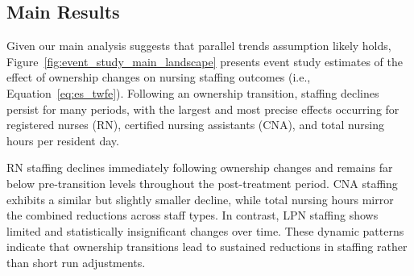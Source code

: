 \documentclass[12pt]{article}
\begin{document}
\subsection{Main Results}

Given our main analysis suggests that parallel trends assumption likely holds, Figure~\ref{fig:event_study_main_landscape} presents event study estimates of the effect of ownership changes on nursing staffing outcomes (i.e., Equation~\ref{eq:es_twfe}). Following an ownership transition, staffing declines persist for many periods, with the largest and most precise effects occurring for registered nurses (RN), certified nursing assistants (CNA), and total nursing hours per resident day.

RN staffing declines immediately following ownership changes and remains far below pre-transition levels throughout the post-treatment period. CNA staffing exhibits a similar but slightly smaller decline, while total nursing hours mirror the combined reductions across staff types. In contrast, LPN staffing shows limited and statistically insignificant changes over time. These dynamic patterns indicate that ownership transitions lead to sustained reductions in staffing rather than short run adjustments.


\end{document}
